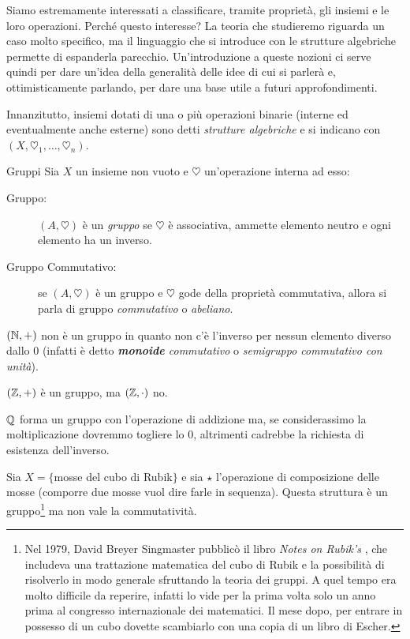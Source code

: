 		Siamo estremamente interessati a classificare, tramite proprietà, gli insiemi e le loro operazioni. Perché questo interesse? La teoria che studieremo riguarda un caso molto specifico, ma il linguaggio che si introduce con le strutture algebriche permette di espanderla parecchio. Un'introduzione a queste nozioni ci serve quindi per dare un'idea della generalità delle idee di cui si parlerà e, ottimisticamente parlando, per dare una base utile a futuri approfondimenti.
		
		Innanzitutto, insiemi dotati di una o più operazioni binarie (interne ed eventualmente anche esterne) sono detti \emph{strutture algebriche} e si indicano con $(X,\heartsuit_1,\ldots,\heartsuit_n)$.
		\begin{subsubsection}{Gruppi}
			Sia $X$ un insieme non vuoto e $\heartsuit$ un'operazione interna ad esso:
			\begin{description}
				\item[Gruppo:] $(A,\heartsuit)$ è un \emph{gruppo} se $\heartsuit$ è associativa, ammette elemento neutro e ogni elemento ha un inverso.
				\item[Gruppo Commutativo:] se $(A,\heartsuit)$ è un gruppo e $\heartsuit$ gode della proprietà commutativa, allora si parla di gruppo \emph{commutativo} o \emph{abeliano}.
			\end{description}
			\begin{eg}
				$(\mathbb{N},+)$ non è un gruppo in quanto non c'è l'inverso per nessun elemento diverso dallo $0$ (infatti è detto \emph{\textbf{monoide} commutativo} o \emph{semigruppo commutativo con unità}).
			\end{eg}
			\begin{eg}
				$(\mathbb{Z},+)$ è un gruppo, ma $(\mathbb{Z},\cdot)$ no.
			\end{eg}
			\begin{eg}
				$\mathbb{Q}$ forma un gruppo con l'operazione di addizione ma, se considerassimo la moltiplicazione dovremmo togliere lo $0$, altrimenti cadrebbe la richiesta di esistenza dell'inverso.
			\end{eg}
			\begin{eg}
				Sia $X=\{$mosse del cubo di Rubik$\}$ e sia $\star$ l'operazione di composizione delle mosse (comporre due mosse vuol dire farle in sequenza). Questa struttura è un gruppo\footnote{Nel 1979, David Breyer Singmaster pubblicò il libro \emph{Notes on Rubik's }, che includeva una trattazione matematica del cubo di Rubik e la possibilità di risolverlo in modo generale sfruttando la teoria dei gruppi. A quel tempo era molto difficile da reperire, infatti lo vide per la prima volta solo un anno prima al congresso internazionale dei matematici. Il mese dopo, per entrare in possesso di un cubo dovette scambiarlo con una copia di un libro di Escher.} ma non vale la commutatività.
			\end{eg}
		\end{subsubsection}
